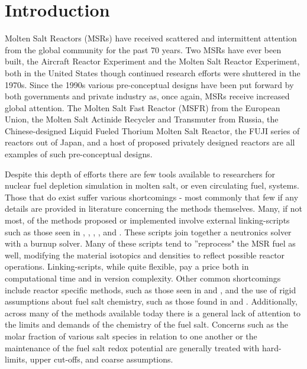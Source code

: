 \documentclass[]{elsarticle}
\begin{document}
\section{Introduction} \label{sec:intro}
Molten Salt Reactors (MSRs) have received scattered and intermittent attention
from the global community for the past 70 years. Two MSRs have ever been built,
the Aircraft Reactor Experiment and the Molten Salt Reactor Experiment, both
in the United States though continued research efforts were shuttered in the
1970s. Since the 1990s various pre-conceptual designs have been put forward
by both governments and private industry as, once again, MSRs receive increased
global attention. The Molten Salt Fast Reactor (MSFR) from the European Union,
the Molten Salt Actinide Recycler and Transmuter from Russia, the 
Chinese-designed Liquid Fueled Thorium Molten Salt Reactor, the
FUJI series of reactors out of Japan, and a host of proposed privately designed
reactors are all examples of such pre-conceptual designs.

Despite this depth
of efforts there are few tools available to researchers for nuclear fuel
depletion simulation in molten salt, or even circulating fuel, systems. Those
that do exist suffer various shortcomings - most commonly that few if any
details are provided in literature concerning the methods themselves. 
Many, if not most, of the methods
proposed or implemented involve external linking-scripts such as those seen in
\cite{jeong_development_2015}, \cite{mitachi_three-region_2007},
\cite{nuttin_potential_2005},  \cite{ridley_method_2017}, and
\cite{sheu_depletion_2013}. These scripts 
join together a neutronics solver with a burnup solver. Many of these scripts
tend to ''reprocess" the MSR fuel as well, modifying the material isotopics and 
densities to
reflect possible reactor operations. Linking-scripts, while quite flexible, pay
a price both in computational time and in version complexity.
Other common shortcomings include  
reactor specific methods, such as those seen in \cite{aufiero_extended_2013} and
\cite{ridley_method_2017}, and the use of rigid assumptions about fuel salt
chemistry, such as those found in \cite{fiorina_molten_2013} and 
\cite{ridley_method_2017}. Additionally, across many of the methods available
today 
there is a general lack of attention to the limits and demands of the chemistry
of the fuel salt. Concerns such as the molar fraction of various salt species
in relation to one another or the maintenance of the fuel salt redox potential are
generally treated with hard-limits, upper cut-offs, and coarse assumptions.
\end{document}
